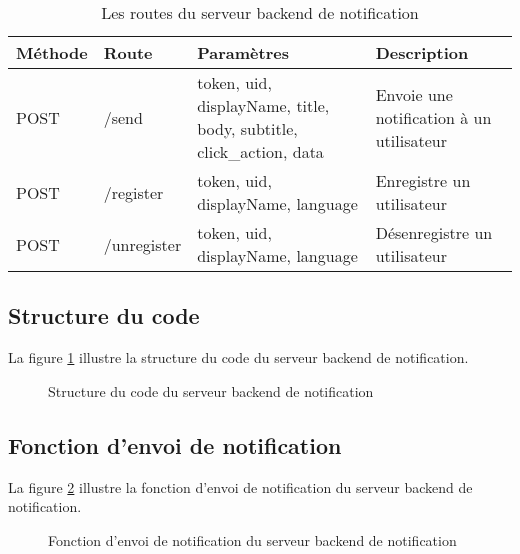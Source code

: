 \begin{table}[H]
    \centering
    \begin{tabular}{|l|l|p{6cm}|p{6cm}|}
    \hline
    Méthode & Route & Paramètres & Description \\ \hline
    POST & /send & token, uid, displayName, title, body, subtitle, click\_action, data & Envoie une notification à un utilisateur \\ \hline
    POST & /register & token, uid, displayName, language & Enregistre un utilisateur \\ \hline
    POST & /unregister & token, uid, displayName, language & Désenregistre un utilisateur \\ \hline
    \end{tabular}
    \caption{Les routes du serveur backend de notification}
    \label{appendix:backend_notification_routes}
\end{table}

\subsection{Structure du code}
La figure \ref{appendix:backend_notification_structure} illustre la structure du code du serveur backend de notification.

\begin{figure}[H]
    \centering
    \caption{Structure du code du serveur backend de notification}
    \label{appendix:backend_notification_structure}
\end{figure}


\subsection{Fonction d'envoi de notification}

La figure \ref{appendix:backend_notification_send} illustre la fonction d'envoi de notification du serveur backend de notification.

\begin{figure}[H]
    \centering
    \caption{Fonction d'envoi de notification du serveur backend de notification}
    \label{appendix:backend_notification_send}
\end{figure}
